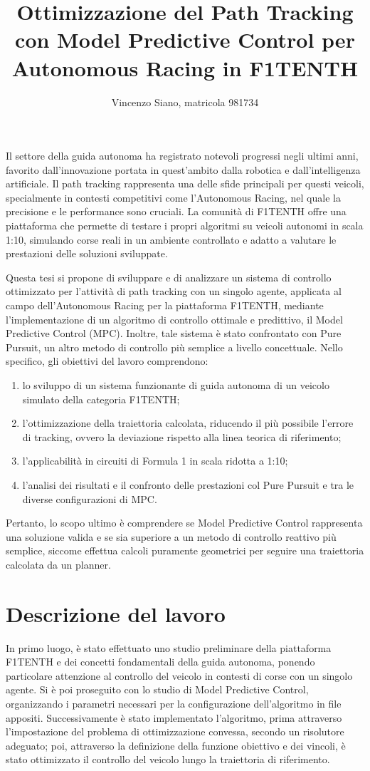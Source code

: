 \documentclass[12pt,a4paper]{article}
\title{\textbf{Ottimizzazione del Path Tracking con Model Predictive Control per Autonomous Racing in F1TENTH}}
\author{\Large Vincenzo Siano, matricola 981734}
\begin{document}
\date{}
\maketitle
Il settore della guida autonoma ha registrato notevoli progressi negli 
ultimi anni, favorito dall'innovazione portata in quest'ambito dalla robotica e dall'intelligenza artificiale. Il path tracking rappresenta una delle sfide principali per questi veicoli, specialmente in contesti competitivi
come l'Autonomous Racing, nel quale la precisione e le performance sono cruciali. 
La comunità di F1TENTH offre una piattaforma che permette di testare i 
propri algoritmi su veicoli autonomi in scala 1:10, simulando corse reali in un ambiente controllato e adatto a valutare le prestazioni delle soluzioni sviluppate.

\medskip
\noindent Questa tesi si propone di sviluppare e di analizzare un sistema di controllo ottimizzato per l'attività 
di path tracking con un singolo agente, applicata al campo dell'Autonomous Racing per la piattaforma 
F1TENTH, mediante l'implementazione di un algoritmo di controllo ottimale e predittivo, il Model Predictive Control (MPC).
Inoltre, tale sistema è stato confrontato con Pure Pursuit, un altro metodo di controllo più semplice 
a livello concettuale. Nello specifico, gli obiettivi del lavoro comprendono:
\begin{enumerate}
    \item lo sviluppo di un sistema funzionante di guida autonoma di un veicolo simulato della categoria F1TENTH;
    \item l'ottimizzazione della traiettoria calcolata, riducendo il più possibile l'errore di 
    tracking, ovvero la deviazione rispetto alla linea teorica di riferimento;
    \item l'applicabilità in circuiti di Formula 1 in scala ridotta a 1:10;
    \item l'analisi dei risultati e il confronto delle prestazioni col Pure Pursuit e tra le diverse configurazioni di MPC. 
\end{enumerate}
Pertanto, lo scopo ultimo è comprendere se Model Predictive Control rappresenta una soluzione valida e se sia superiore
a un metodo di controllo reattivo più semplice, siccome effettua calcoli puramente geometrici per
seguire una traiettoria calcolata da un planner.

\section{Descrizione del lavoro}
In primo luogo, è stato effettuato uno studio preliminare della piattaforma F1TENTH e dei concetti 
fondamentali della guida autonoma, ponendo particolare attenzione al controllo del veicolo in 
contesti di corse con un singolo agente.
Si è poi proseguito con lo studio di Model Predictive Control, organizzando i parametri necessari per la configurazione dell'algoritmo in file appositi.
Successivamente è stato implementato l'algoritmo, prima attraverso l'impostazione del problema di ottimizzazione convessa, secondo un risolutore adeguato; poi, attraverso la definizione della funzione obiettivo e dei vincoli, è stato ottimizzato il controllo del veicolo lungo la traiettoria di riferimento. 
\end{document}
